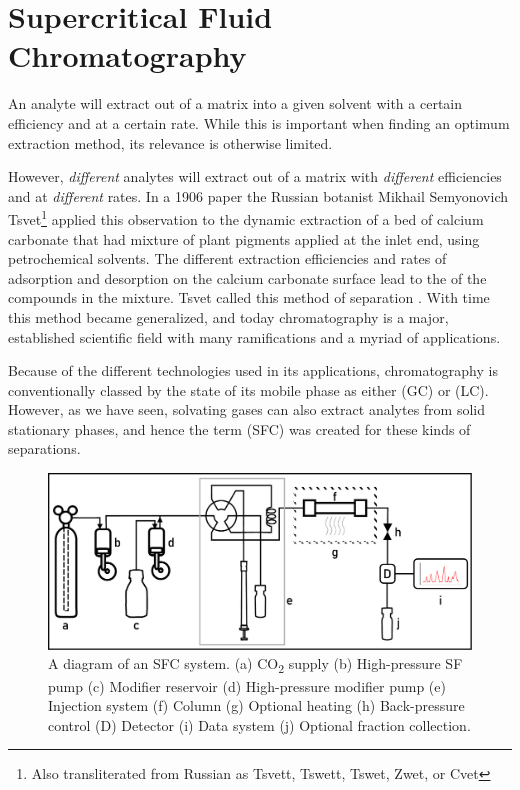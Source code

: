 \section{Supercritical Fluid Chromatography}

An analyte will extract out of a matrix into a given solvent with a certain
efficiency and at a certain rate. While this is important when finding an
optimum extraction method, its relevance is otherwise limited.

However, \textit{different} analytes will extract out of a matrix with
\textit{different} efficiencies and at \textit{different} rates. In a 1906 paper
the Russian botanist Mikhail Semyonovich Tsvet\footnote{Also transliterated from
Russian as Tsvett, Tswett, Tswet, Zwet, or Cvet} applied this observation to the
dynamic extraction of a bed of calcium carbonate that had mixture of plant
pigments applied at the inlet end, using petrochemical solvents. The different
extraction efficiencies and rates of adsorption and desorption on the calcium
carbonate surface lead to the  of the compounds in the
mixture. Tsvet called this method of separation 
\autocite{Ettre1993,Ettre1993a}. With time this method became generalized, and
today chromatography is a major, established scientific field with many
ramifications and a myriad of applications.

Because of the different technologies used in its applications, chromatography
is conventionally classed by the state of its mobile phase as either
 (GC) or  (LC).
However, as we have seen, solvating gases can also extract analytes from solid
stationary phases, and hence the term  (SFC) was created for these kinds of separations.

\begin{figure}
\centering
\includegraphics[width=\textwidth]{Figures/SFC_System}
\decoRule
\caption[SFC system diagram]{A diagram of an SFC system. (a) CO\textsubscript{2}
supply (b) High-pressure SF pump (c) Modifier reservoir (d) High-pressure
modifier pump (e) Injection system (f) Column (g) Optional heating (h)
Back-pressure control (D) Detector (i) Data system (j) Optional fraction
collection.}
\label{fig:sfcdiagram}

\end{figure}

